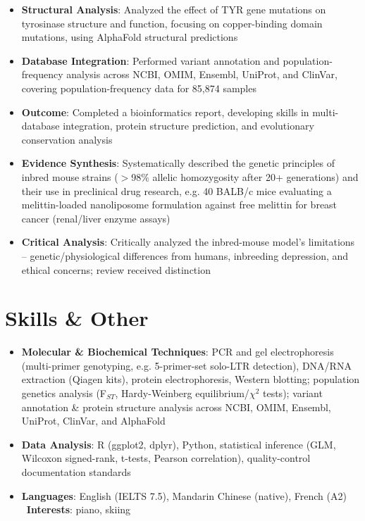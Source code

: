 \documentclass{my-resume}
\begin{document}
\begin{itemize}[parsep=0.2ex]
  \item \textbf{Structural Analysis}: Analyzed the effect of TYR gene mutations on tyrosinase structure and function, focusing on copper-binding domain mutations, using AlphaFold structural predictions
  \item \textbf{Database Integration}: Performed variant annotation and population-frequency analysis across NCBI, OMIM, Ensembl, UniProt, and ClinVar, covering population-frequency data for 85,874 samples
  \item \textbf{Outcome}: Completed a bioinformatics report, developing skills in multi-database integration, protein structure prediction, and evolutionary conservation analysis
\end{itemize}

\begin{itemize}[parsep=0.2ex]
  \item \textbf{Evidence Synthesis}: Systematically described the genetic principles of inbred mouse strains ($>$98\% allelic homozygosity after 20+ generations) and their use in preclinical drug research, e.g. 40 BALB/c mice evaluating a melittin-loaded nanoliposome formulation against free melittin for breast cancer (renal/liver enzyme assays)
  \item \textbf{Critical Analysis}: Critically analyzed the inbred-mouse model's limitations -- genetic\slash physiological differences from humans, inbreeding depression, and ethical concerns; review received distinction
\end{itemize}

\section{Skills \& Other}
\entrySkillsSep
\begin{itemize}[parsep=0.2ex]
  \item \textbf{Molecular \& Biochemical Techniques}: PCR and gel electrophoresis (multi-primer genotyping, e.g. 5-primer-set solo-LTR detection), DNA/RNA extraction (Qiagen kits), protein electrophoresis, Western blotting; population genetics analysis (F$_{ST}$, Hardy-Weinberg equilibrium/$\chi^2$ tests); variant annotation \& protein structure analysis across NCBI, OMIM, Ensembl, UniProt, ClinVar, and AlphaFold
  \item \textbf{Data Analysis}: R (ggplot2, dplyr), Python, statistical inference (GLM, Wilcoxon signed-rank, t-tests, Pearson correlation), quality-control documentation standards
  \item \textbf{Languages}: English (IELTS 7.5), Mandarin Chinese (native), French (A2) \textbar\ \textbf{Interests}: piano, skiing
\end{itemize}
\end{document}
